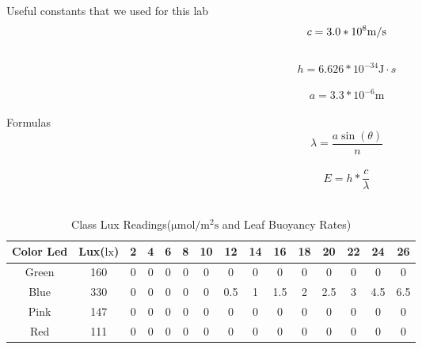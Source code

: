 \documentclass{article}
\begin{document}
    Useful constants that we used for this lab\\
    $$c = 3.0 * 10^{8} \si[per-mode=symbol]{\metre\per\second}$$\\
    $$h = 6.626 * 10^{-34} \si{\joule} \cdot s$$\\
    $$a = 3.3 * 10^{-6} \si{\metre}$$\\
    Formulas\\
    $$\lambda = \dfrac{a \sin(\theta)}{n}$$\\
    $$E = h * \dfrac{c}{\lambda}$$\\
    \begin{longtable}[c]{| c c || c c c c c c c c c c c c c|}
        \caption{Class Lux Readings($\si{\micro\mol\per\metre\tothe{2}\second}$ and Leaf Buoyancy Rates) \label{long}}\\
        \hline
        Color Led & Lux($\si\lux$) & 2  & 4 & 6 & 8 & 10 & 12 & 14 & 16 & 18 & 20 & 22 & 24 & 26\\
        \hline
        Green & 160 & 0 & 0 & 0 & 0 & 0 & 0   & 0 & 0   & 0 & 0   & 0 & 0   & 0 \\
        Blue  & 330 & 0 & 0 & 0 & 0 & 0 & 0.5 & 1 & 1.5 & 2 & 2.5 & 3 & 4.5 & 6.5\\
        Pink  & 147 & 0 & 0 & 0 & 0 & 0 & 0   & 0 & 0   & 0 & 0   & 0 & 0   & 0\\
        Red   & 111 & 0 & 0 & 0 & 0 & 0 & 0   & 0 & 0   & 0 & 0   & 0 & 0   & 0\\
        \hline
    \end{longtable}
\end{document}
